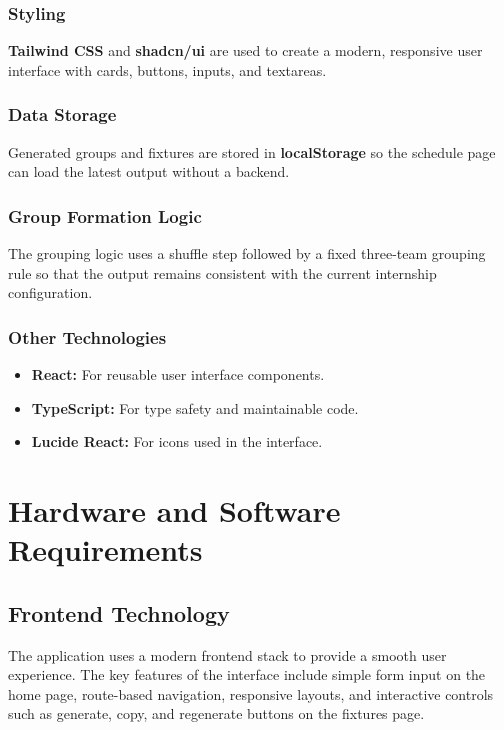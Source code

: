 \documentclass[12pt,a4paper]{report}
\begin{document}
\subsection{Styling}
\textbf{Tailwind CSS} and \textbf{shadcn/ui} are used to create a modern, responsive user interface with cards, buttons, inputs, and textareas.

\subsection{Data Storage}
Generated groups and fixtures are stored in \textbf{localStorage} so the schedule page can load the latest output without a backend.

\subsection{Group Formation Logic}
The grouping logic uses a shuffle step followed by a fixed three-team grouping rule so that the output remains consistent with the current internship configuration.

\subsection{Other Technologies}
\begin{itemize}
    \item \textbf{React:} For reusable user interface components.
    \item \textbf{TypeScript:} For type safety and maintainable code.
    \item \textbf{Lucide React:} For icons used in the interface.
\end{itemize}


\chapter{Hardware and Software Requirements}

\section{Frontend Technology}
The application uses a modern frontend stack to provide a smooth user experience. The key features of the interface include simple form input on the home page, route-based navigation, responsive layouts, and interactive controls such as generate, copy, and regenerate buttons on the fixtures page.
\end{document}
